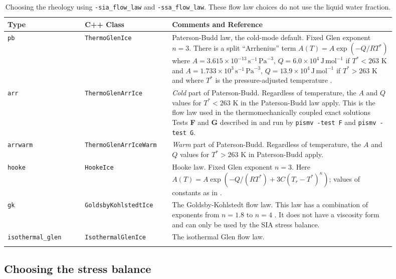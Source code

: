 \begin{table}[ht]
\centering
{}
\small
\begin{tabular}{p{0.18\linewidth}p{0.2\linewidth}p{0.52\linewidth}}\toprule
\textbf{Type} & C++ Class & \textbf{Comments and Reference} \\ \midrule
\texttt{pb} &\texttt{ThermoGlenIce}  & Paterson-Budd law, the cold-mode default.  Fixed Glen exponent $n=3$.  There is a split ``Arrhenius'' term $A(T) = A \exp(-Q/RT^*)$ where \mbox{$A = 3.615 \times 10^{-13}\, \text{s}^{-1}\, \text{Pa}^{-3}$}, \mbox{$Q = 6.0 \times 10^4\, \text{J}\, \text{mol}^{-1}$} if $T^* < 263$ K and
 \mbox{$A = 1.733 \times 10^{3}\, \text{s}^{-1}\, \text{Pa}^{-3}$}, \mbox{$Q = 13.9 \times 10^4\, \text{J}\, \text{mol}^{-1}$} if $T^* > 263$ K and where $T^*$ is the pressure-adjusted temperature \cite{PatersonBudd}. \\
\texttt{arr} &  \texttt{ThermoGlenArrIce} & \emph{Cold} part of Paterson-Budd.  Regardless of temperature, the $A$ and $Q$ values for $T^*<263$ K in  the Paterson-Budd law apply.  This is the flow law used in the thermomechanically coupled exact solutions Tests \textbf{F} and \textbf{G} described in \cite{BBL,BB} and run by \texttt{pismv -test F} and \texttt{pismv -test G}. \\
\texttt{arrwarm} & \texttt{ThermoGlenArrIceWarm} & \emph{Warm} part of Paterson-Budd.  Regardless of temperature, the $A$ and $Q$ values for $T^*>263$ K in Paterson-Budd apply.\\
\texttt{hooke} & \texttt{HookeIce} & Hooke law.  Fixed Glen exponent $n=3$.  Here  \mbox{$A(T) = A \exp(-Q/(RT^*) + 3C (T_r - T^*)^\kappa)$;} values of  constants as in \cite{Hooke,PayneBaldwin}.\\
\texttt{gk} & \texttt{GoldsbyKohlstedtIce} & The  Goldsby-Kohlstedt flow law.  This law has a combination of exponents  from $n=1.8$ to $n=4$ \cite{GoldsbyKohlstedt}. It does not have a viscosity form and can only be used by the SIA stress balance. \\
\texttt{isothermal_glen} &  \texttt{IsothermalGlenIce} &The isothermal Glen flow law. \\
\bottomrule
\normalsize	
\end{tabular}
\caption{Choosing the rheology using \texttt{-sia_flow_law} and \texttt{-ssa_flow_law}.  These flow law choices do not use the liquid water fraction.}
\label{tab:flowlaw}
\end{table}


\subsection{Choosing the stress balance}  \label{subsect:ssacontrol}


